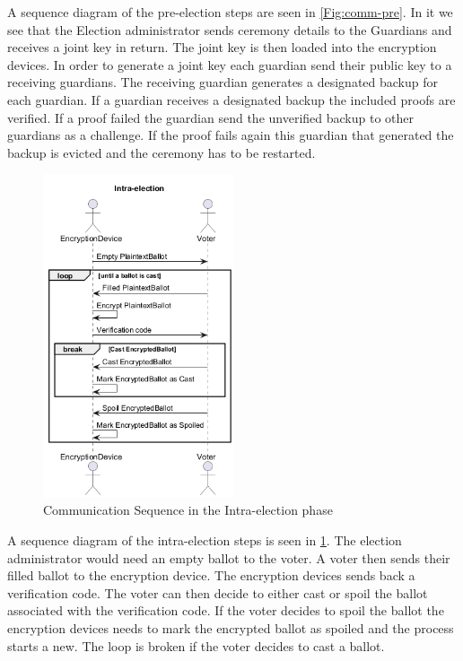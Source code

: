 A sequence diagram of the pre-election steps are seen in \ref{Fig:comm-pre}. In it we see that the Election administrator sends ceremony details to the Guardians and receives a joint key in return. The joint key is then loaded into the encryption devices. In order to generate a joint key each guardian send their public key to a receiving guardians. The receiving guardian generates a designated backup for each guardian. If a guardian receives a designated backup the included proofs are verified. If a proof failed the guardian send the unverified backup to other guardians as a challenge. If the proof fails again this guardian that generated the backup is evicted and the ceremony has to be restarted. 

\begin{figure}
    \centering
    \includegraphics[width=0.5\textwidth]{abbildungen/Diagramme/communication-seq1.png}
    \caption{Communication Sequence in the Intra-election phase}
    \label{Fig:comm-intra}
\end{figure}


A sequence diagram of the intra-election steps is seen in \ref{Fig:comm-intra}. The election administrator would need an empty ballot to the voter. A voter then sends their filled ballot to the encryption device. The encryption devices sends back a verification code. The voter can then decide to either cast or spoil the ballot associated with the verification code. If the voter decides to spoil the ballot the encryption devices needs to mark the encrypted ballot as spoiled and the process starts a new. The loop is broken if the voter decides to cast a ballot.

